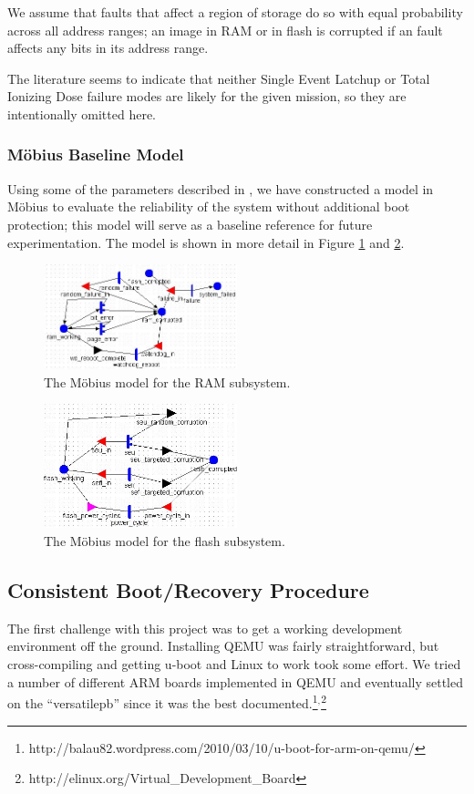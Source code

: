 We assume that faults that affect a region of storage do so with equal probability across all address ranges; an image in RAM or in flash is corrupted if an fault affects any bits in its address range.

The literature seems to indicate that neither Single Event Latchup \cite{Langley2004SEE} or Total Ionizing Dose \cite{Likar2010Novel, Oldham2008TID, Herrmann2013InSitu} failure modes are likely for the given mission, so they are intentionally omitted here.

\subsubsection{M\"obius Baseline Model}

Using some of the parameters described in \cite{Oldham2008TID}, we have constructed a model in M\"obius to evaluate the reliability of the system without additional boot protection; this model will serve as a baseline reference for future experimentation.  The model is shown in more detail in Figure \ref{fig:ram} and \ref{fig:flash}.

\begin{figure}
\includegraphics[width=0.5\textwidth]{ram_model}
\caption{The M\"obius model for the RAM subsystem.}
\label{fig:ram}
\end{figure}

\begin{figure}
\includegraphics[width=0.5\textwidth]{flash_model}
\caption{The M\"obius model for the flash subsystem.}
\label{fig:flash}
\end{figure}


\subsection{Consistent Boot/Recovery Procedure}
The first challenge with this project was to get a working development
environment off the ground.  Installing QEMU was fairly straightforward, but
cross-compiling and getting u-boot and Linux to work took some effort.  We tried
a number of different ARM boards implemented in QEMU and eventually settled on
the ``versatilepb'' since it was the best documented.\footnote{http://balau82.wordpress.com/2010/03/10/u-boot-for-arm-on-qemu/}$^{,}$\footnote{http://elinux.org/Virtual\_Development\_Board}

